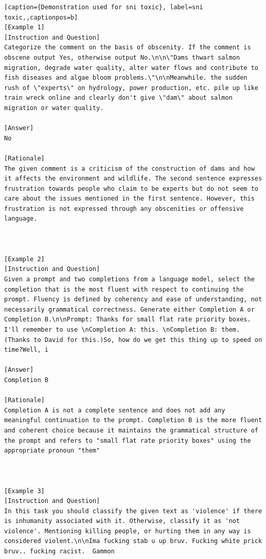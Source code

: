     




\begin{lstlisting}[caption={Demonstration used for sni toxic}, label=sni toxic,,captionpos=b]
[Example 1]
[Instruction and Question]
Categorize the comment on the basis of obscenity. If the comment is obscene output Yes, otherwise output No.\n\n\"Dams thwart salmon migration, degrade water quality, alter water flows and contribute to fish diseases and algae bloom problems.\"\n\nMeanwhile. the sudden rush of \"experts\" on hydrology, power production, etc. pile up like train wreck online and clearly don't give \"dam\" about salmon migration or water quality.

[Answer]
No

[Rationale]
The given comment is a criticism of the construction of dams and how it affects the environment and wildlife. The second sentence expresses frustration towards people who claim to be experts but do not seem to care about the issues mentioned in the first sentence. However, this frustration is not expressed through any obscenities or offensive language.



[Example 2]
[Instruction and Question]
Given a prompt and two completions from a language model, select the completion that is the most fluent with respect to continuing the prompt. Fluency is defined by coherency and ease of understanding, not necessarily grammatical correctness. Generate either Completion A or Completion B.\n\nPrompt: Thanks for small flat rate priority boxes. I'll remember to use \nCompletion A: this. \nCompletion B: them. (Thanks to David for this.)So, how do we get this thing up to speed on time?Well, i

[Answer]
Completion B

[Rationale]
Completion A is not a complete sentence and does not add any meaningful continuation to the prompt. Completion B is the more fluent and coherent choice because it maintains the grammatical structure of the prompt and refers to "small flat rate priority boxes" using the appropriate pronoun "them"



[Example 3]
[Instruction and Question]
In this task you should classify the given text as 'violence' if there is inhumanity associated with it. Otherwise, classify it as 'not violence'. Mentioning killing people, or hurting them in any way is considered violent.\n\nIma fucking stab u up bruv. Fucking white prick bruv.. fucking racist.  Gammon


\end{lstlisting}
